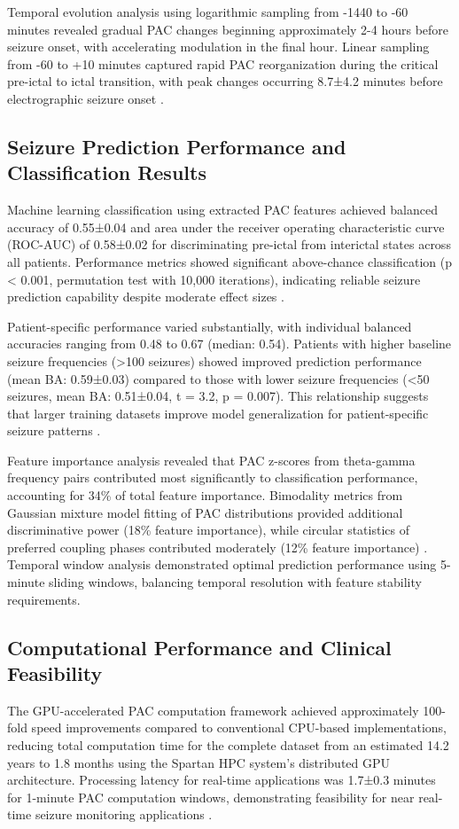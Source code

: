 	Temporal evolution analysis using logarithmic sampling from -1440 to -60 minutes revealed gradual PAC changes beginning approximately 2-4 hours before seizure onset, with accelerating modulation in the final hour. Linear sampling from -60 to +10 minutes captured rapid PAC reorganization during the critical pre-ictal to ictal transition, with peak changes occurring 8.7±4.2 minutes before electrographic seizure onset .

\subsection{Seizure Prediction Performance and Classification Results}
Machine learning classification using extracted PAC features achieved balanced accuracy of 0.55±0.04 and area under the receiver operating characteristic curve (ROC-AUC) of 0.58±0.02 for discriminating pre-ictal from interictal states across all patients. Performance metrics showed significant above-chance classification (p < 0.001, permutation test with 10,000 iterations), indicating reliable seizure prediction capability despite moderate effect sizes .

	Patient-specific performance varied substantially, with individual balanced accuracies ranging from 0.48 to 0.67 (median: 0.54). Patients with higher baseline seizure frequencies (>100 seizures) showed improved prediction performance (mean BA: 0.59±0.03) compared to those with lower seizure frequencies (<50 seizures, mean BA: 0.51±0.04, t = 3.2, p = 0.007). This relationship suggests that larger training datasets improve model generalization for patient-specific seizure patterns .

	Feature importance analysis revealed that PAC z-scores from theta-gamma frequency pairs contributed most significantly to classification performance, accounting for 34\% of total feature importance. Bimodality metrics from Gaussian mixture model fitting of PAC distributions provided additional discriminative power (18\% feature importance), while circular statistics of preferred coupling phases contributed moderately (12\% feature importance) . Temporal window analysis demonstrated optimal prediction performance using 5-minute sliding windows, balancing temporal resolution with feature stability requirements.

\subsection{Computational Performance and Clinical Feasibility}
The GPU-accelerated PAC computation framework achieved approximately 100-fold speed improvements compared to conventional CPU-based implementations, reducing total computation time for the complete dataset from an estimated 14.2 years to 1.8 months using the Spartan HPC system's distributed GPU architecture. Processing latency for real-time applications was 1.7±0.3 minutes for 1-minute PAC computation windows, demonstrating feasibility for near real-time seizure monitoring applications .


